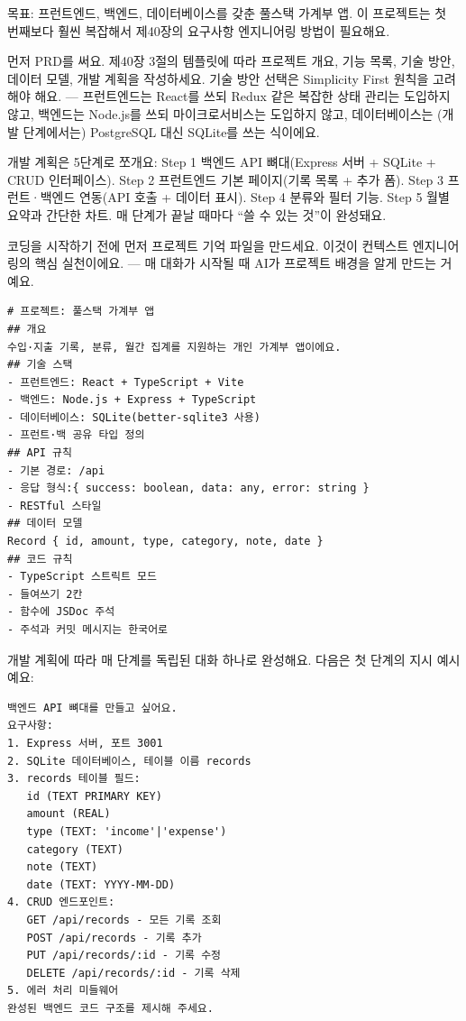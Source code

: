

목표: 프런트엔드, 백엔드, 데이터베이스를 갖춘 풀스택 가계부 앱. 이 프로젝트는 첫 번째보다 훨씬 복잡해서 제40장의 요구사항 엔지니어링 방법이 필요해요.

먼저 PRD를 써요. 제40장 3절의 템플릿에 따라 프로젝트 개요, 기능 목록, 기술 방안, 데이터 모델, 개발 계획을 작성하세요. 기술 방안 선택은 Simplicity First 원칙을 고려해야 해요. — 프런트엔드는 React를 쓰되 Redux 같은 복잡한 상태 관리는 도입하지 않고, 백엔드는 Node.js를 쓰되 마이크로서비스는 도입하지 않고, 데이터베이스는 (개발 단계에서는) PostgreSQL 대신 SQLite를 쓰는 식이에요.

개발 계획은 5단계로 쪼개요: Step 1 백엔드 API 뼈대(Express 서버 + SQLite + CRUD 인터페이스). Step 2 프런트엔드 기본 페이지(기록 목록 + 추가 폼). Step 3 프런트·백엔드 연동(API 호출 + 데이터 표시). Step 4 분류와 필터 기능. Step 5 월별 요약과 간단한 차트. 매 단계가 끝날 때마다 “쓸 수 있는 것”이 완성돼요.


코딩을 시작하기 전에 먼저 프로젝트 기억 파일을 만드세요. 이것이 컨텍스트 엔지니어링의 핵심 실천이에요. — 매 대화가 시작될 때 AI가 프로젝트 배경을 알게 만드는 거예요.

\begin{lstlisting}
# 프로젝트: 풀스택 가계부 앱
## 개요
수입·지출 기록, 분류, 월간 집계를 지원하는 개인 가계부 앱이에요.
## 기술 스택
- 프런트엔드: React + TypeScript + Vite
- 백엔드: Node.js + Express + TypeScript
- 데이터베이스: SQLite(better-sqlite3 사용)
- 프런트·백 공유 타입 정의
## API 규칙
- 기본 경로: /api
- 응답 형식:{ success: boolean, data: any, error: string }
- RESTful 스타일
## 데이터 모델
Record { id, amount, type, category, note, date }
## 코드 규칙
- TypeScript 스트릭트 모드
- 들여쓰기 2칸
- 함수에 JSDoc 주석
- 주석과 커밋 메시지는 한국어로
\end{lstlisting}


개발 계획에 따라 매 단계를 독립된 대화 하나로 완성해요. 다음은 첫 단계의 지시 예시예요:

\begin{lstlisting}
백엔드 API 뼈대를 만들고 싶어요.
요구사항:
1. Express 서버, 포트 3001
2. SQLite 데이터베이스, 테이블 이름 records
3. records 테이블 필드:
   id (TEXT PRIMARY KEY)
   amount (REAL)
   type (TEXT: 'income'|'expense')
   category (TEXT)
   note (TEXT)
   date (TEXT: YYYY-MM-DD)
4. CRUD 엔드포인트:
   GET /api/records - 모든 기록 조회
   POST /api/records - 기록 추가
   PUT /api/records/:id - 기록 수정
   DELETE /api/records/:id - 기록 삭제
5. 에러 처리 미들웨어
완성된 백엔드 코드 구조를 제시해 주세요.
\end{lstlisting}

